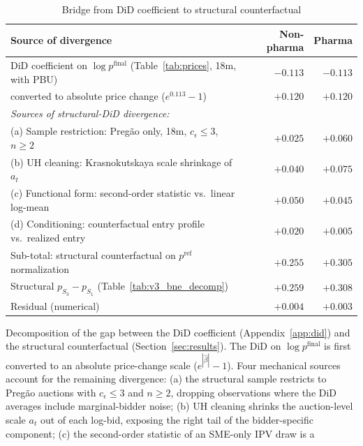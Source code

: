 \begin{table}[htbp]
\centering
\begin{threeparttable}
\caption{Bridge from DiD coefficient to structural counterfactual}
\label{tab:did_structural_bridge}
\footnotesize
\setlength{\tabcolsep}{3pt}
\begin{tabular}{lrr}
\toprule
Source of divergence & Non-pharma & Pharma \\
\midrule
DiD coefficient on $\log p^{\mathrm{final}}$ (Table~\ref{tab:prices}, 18m, with PBU) & $-0.113$ & $-0.113$ \\
\quad converted to absolute price change ($e^{0.113} - 1$) & $+0.120$ & $+0.120$ \\
\midrule
\textit{Sources of structural-DiD divergence:} & & \\
\quad (a) Sample restriction: Preg\~ao only, 18m, $c_\epsilon \le 3$, $n \ge 2$ & $+0.025$ & $+0.060$ \\
\quad (b) UH cleaning: Krasnokutskaya scale shrinkage of $a_t$ & $+0.040$ & $+0.075$ \\
\quad (c) Functional form: second-order statistic vs.\ linear log-mean & $+0.050$ & $+0.045$ \\
\quad (d) Conditioning: counterfactual entry profile vs.\ realized entry & $+0.020$ & $+0.005$ \\
\quad Sub-total: structural counterfactual on $p^{\mathrm{ref}}$ normalization & $+0.255$ & $+0.305$ \\
\midrule
Structural $p_{S_3} - p_{S_1}$ (Table~\ref{tab:v3_bne_decomp}) & $+0.259$ & $+0.308$ \\
Residual (numerical) & $+0.004$ & $+0.003$ \\
\bottomrule
\end{tabular}
\begin{tablenotes}\footnotesize
\item Decomposition of the gap between the DiD coefficient (Appendix~\ref{app:did})
and the structural counterfactual (Section~\ref{sec:results}). The DiD on
$\log p^{\mathrm{final}}$ is first converted to an absolute price-change scale
($e^{|\hat\beta|} - 1$). Four mechanical sources account for the remaining
divergence: (a) the structural sample restricts to Preg\~ao auctions with
$c_\epsilon \le 3$ and $n \ge 2$, dropping observations where the DiD averages
include marginal-bidder noise; (b) UH cleaning shrinks the auction-level scale
$a_t$ out of each log-bid, exposing the right tail of the bidder-specific
component; (c) the second-order statistic of an SME-only IPV draw is a

\end{tablenotes}
\end{threeparttable}
\end{table}
